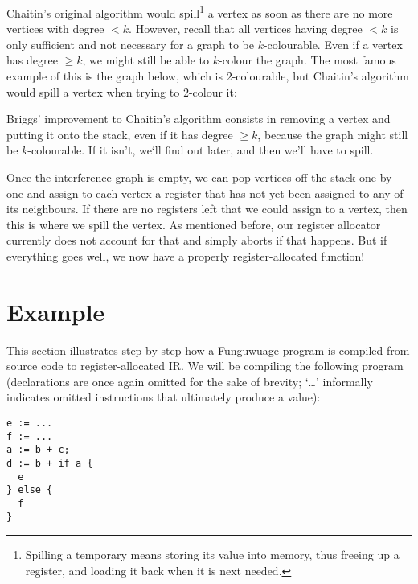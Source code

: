 \documentclass[12pt]{report}
\newcommand{\langname}{Funguwuage}
\begin{document}
Chaitin’s original algorithm would spill\footnote{Spilling a temporary means storing its value into memory, thus freeing up a register, and
loading it back when it is next needed.} a vertex as soon as there are no more vertices with degree $< k$. However, recall that all
vertices having degree $< k$ is only sufficient and not necessary for a graph to be $k$-colourable. Even if a vertex has degree $\geq k$, we
might still be able to $k$-colour the graph. The most famous example of this is the graph below, which is $2$-colourable, but Chaitin’s
algorithm would spill a vertex when trying to $2$-colour it:
\begin{center}
\end{center}

\noindent Briggs’ improvement to Chaitin’s algorithm consists in removing a vertex and putting it onto the stack, even if it has degree
$\geq k$, because the graph might still be $k$-colourable. If it isn’t, we‘ll find out later, and then we’ll have to spill.

Once the interference graph is empty, we can pop vertices off the stack one by one and assign to each vertex a register that has not yet
been assigned to any of its neighbours. If there are no registers left that we could assign to a vertex, then this is where we spill the
vertex. As mentioned before, our register allocator currently does not account for that and simply aborts if that happens. But if everything
goes well, we now have a properly register-allocated function!

\section{Example}
This section illustrates step by step how a \langname{} program is compiled from source code to register-allocated IR. We will be compiling
the following program (declarations are once again omitted for the sake of brevity; ‘\ldots’ informally indicates omitted instructions that
ultimately produce a value):
\begin{Verbatim}
e := ...
f := ...
a := b + c;
d := b + if a {
  e
} else {
  f
}
\end{Verbatim}
\end{document}
